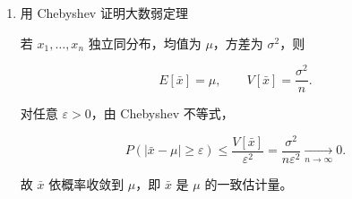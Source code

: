 \begin{question}
\begin{solution}
\begin{enumerate}
因此

\[
P(|x-\mu|\ge a)\le \frac{\sigma^2}{a^2}.
\]

这就是 Chebyshev 不等式。

\item 用 Chebyshev 证明大数弱定理

若 \(x_1,\dots,x_n\) 独立同分布，均值为 \(\mu\)，方差为 \(\sigma^2\)，则

\[
E[\bar x]=\mu,\qquad V[\bar x]=\frac{\sigma^2}{n}.
\]

对任意 \(\varepsilon>0\)，由 Chebyshev 不等式，

\[
P(|\bar x-\mu|\ge \varepsilon)
\le \frac{V[\bar x]}{\varepsilon^2}
=\frac{\sigma^2}{n\varepsilon^2}
\xrightarrow[n\to\infty]{}0.
\]

故 \(\bar x\) 依概率收敛到 \(\mu\)，即 \(\bar x\) 是 \(\mu\)
的一致估计量。
\end{enumerate}
\end{solution}
\end{question}



